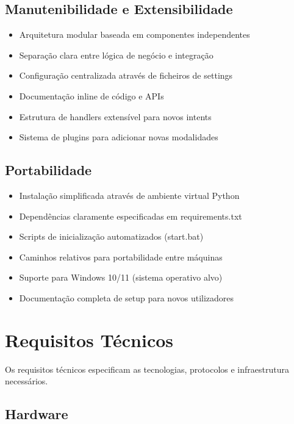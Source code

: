 \subsection{Manutenibilidade e Extensibilidade}

\begin{itemize}
    \item Arquitetura modular baseada em componentes independentes
    \item Separação clara entre lógica de negócio e integração
    \item Configuração centralizada através de ficheiros de settings
    \item Documentação inline de código e APIs
    \item Estrutura de handlers extensível para novos intents
    \item Sistema de plugins para adicionar novas modalidades
\end{itemize}

\subsection{Portabilidade}

\begin{itemize}
    \item Instalação simplificada através de ambiente virtual Python
    \item Dependências claramente especificadas em requirements.txt
    \item Scripts de inicialização automatizados (start.bat)
    \item Caminhos relativos para portabilidade entre máquinas
    \item Suporte para Windows 10/11 (sistema operativo alvo)
    \item Documentação completa de setup para novos utilizadores
\end{itemize}

\section{Requisitos Técnicos}

Os requisitos técnicos especificam as tecnologias, protocolos e infraestrutura necessários.

\subsection{Hardware}

